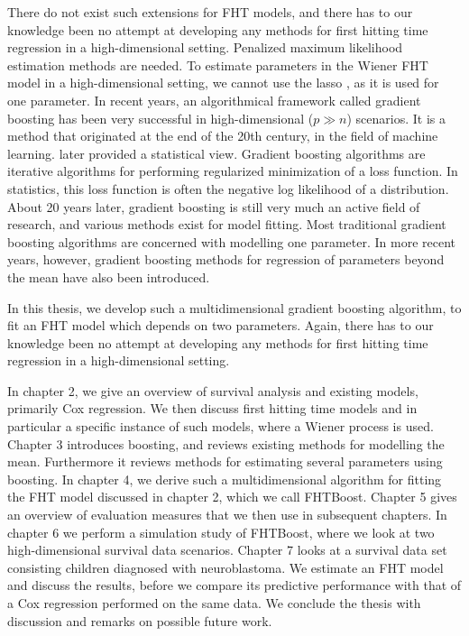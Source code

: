 There do not exist such extensions for FHT models, and there has to our knowledge been no attempt at developing any methods for first hitting time regression in a high-dimensional setting.
Penalized maximum likelihood estimation methods are needed.
To estimate parameters in the Wiener FHT model in a high-dimensional setting, we cannot use the lasso \citep{lasso}, as it is used for one parameter.
In recent years, an algorithmical framework called gradient boosting has been very successful in high-dimensional ($p\gg n$) scenarios.
It is a method that originated at the end of the 20th century, in the field of machine learning.
\citet{friedman2001} later provided a statistical view.
Gradient boosting algorithms are iterative algorithms for performing regularized minimization of a loss function.
In statistics, this loss function is often the negative log likelihood of a distribution.
About 20 years later, gradient boosting is still very much an active field of research, and various methods exist for model fitting.
Most traditional gradient boosting algorithms are concerned with modelling one parameter.
In more recent years, however, gradient boosting methods for regression of parameters beyond the mean have also been introduced.

In this thesis, we develop such a multidimensional gradient boosting algorithm, to fit an FHT model which depends on two parameters.
Again, there has to our knowledge been no attempt at developing any methods for first hitting time regression in a high-dimensional setting.

In chapter 2, we give an overview of survival analysis and existing models, primarily Cox regression.
We then discuss first hitting time models and in particular a specific instance of such models, where a Wiener process is used.
Chapter 3 introduces boosting, and reviews existing methods for modelling the mean.
Furthermore it reviews methods for estimating several parameters using boosting.
In chapter 4, we derive such a multidimensional algorithm for fitting the FHT model discussed in chapter 2, which we call FHTBoost.
Chapter 5 gives an overview of evaluation measures that we then use in subsequent chapters.
In chapter 6 we perform a simulation study of FHTBoost, where we look at two high-dimensional survival data scenarios.
Chapter 7 looks at a survival data set consisting children diagnosed with neuroblastoma.
We estimate an FHT model and discuss the results, before we compare its predictive performance with that of a Cox regression performed on the same data.
We conclude the thesis with discussion and remarks on possible future work.